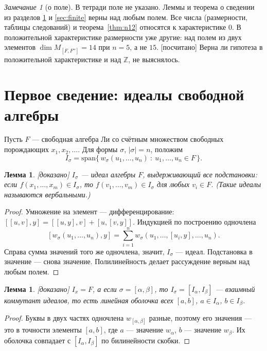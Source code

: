 \documentclass[11pt]{article}
\newcommand{\spn}{\mathrm{span}}
\newcommand{\Z}{\mathbb Z}
\newcommand{\stat}[1]{\textsf{\small[#1]}}
\newcommand{\proved}{\stat{доказано}}
\newcommand{\computed}{\stat{посчитано}}
\theoremstyle{plain}
\newtheorem{lemma}[theorem]{Лемма}
\theoremstyle{definition}
\theoremstyle{remark}
\newtheorem{remark}[theorem]{Замечание}
\begin{document}
\begin{remark}[о поле]
В тетради поле не указано. Леммы и теорема о сведении из разделов \ref{sec:ideals} и \ref{sec:finite} верны над любым полем. Все числа (размерности, таблицы следований) и теорема~\ref{thm:n12} относятся к характеристике $0$. В положительной характеристике размерности уже другие: над полем из двух элементов $\dim M_{[F,F'']}=14$ при $n=5$, а не $15$. \computed{} Верна ли гипотеза в положительной характеристике и над $\Z$, не выяснялось.
\end{remark}

\section{Первое сведение: идеалы свободной алгебры}\label{sec:ideals}

Пусть $F$ --- свободная алгебра Ли со счётным множеством свободных порождающих $x_1,x_2,\dots$. Для формы $\sigma$, $|\sigma|=n$, положим
\[ I_\sigma=\spn\{\,w_\sigma(u_1,\dots,u_n)\ :\ u_1,\dots,u_n\in F\,\}. \]

\begin{lemma}\label{lem:ideal} \proved{}
$I_\sigma$ --- идеал алгебры $F$, выдерживающий все подстановки: если $f(x_1,\dots,x_m)\in I_\sigma$, то $f(v_1,\dots,v_m)\in I_\sigma$ для любых $v_i\in F$. (Такие идеалы называются вербальными.)
\end{lemma}
\begin{proof}
Умножение на элемент --- дифференцирование: $[[u,v],y]=[[u,y],v]+[u,[v,y]]$. Индукцией по построению одночлена
\[ [w_\sigma(u_1,\dots,u_n),y]=\sum_{i=1}^n w_\sigma(u_1,\dots,[u_i,y],\dots,u_n). \]
Справа сумма значений того же одночлена, значит, $I_\sigma$ --- идеал. Подстановка в значение --- снова значение. Полилинейность делает рассуждение верным над любым полем.
\end{proof}

\begin{lemma}\label{lem:comm} \proved{}
$I_x=F$, а если $\sigma=[\alpha,\beta]$, то $I_\sigma=[I_\alpha,I_\beta]$ --- взаимный коммутант идеалов, то есть линейная оболочка всех $[a,b]$, $a\in I_\alpha$, $b\in I_\beta$.
\end{lemma}
\begin{proof}
Буквы в двух частях одночлена $w_{[\alpha,\beta]}$ разные, поэтому его значения --- это в точности элементы $[a,b]$, где $a$ --- значение $w_\alpha$, $b$ --- значение $w_\beta$. Их оболочка совпадает с $[I_\alpha,I_\beta]$ по билинейности скобки.
\end{proof}
\end{document}
